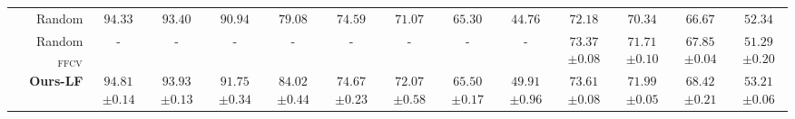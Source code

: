 \begin{table*}[tb]
{\begin{tabular}{crcccccccccccc}
    & Random & $94.33$ & $93.40$ & $90.94$ & $79.08$ & $74.59$ & $71.07$ & $65.30$ & $44.76$ & $72.18$ & $70.34$ & $66.67$ & $52.34$ \\
    &Random$_{\mathrm{FFCV}}$ & - & - & - & - & - & - & - &- & \makecell[tl]{$ 73.37$\\ \tiny{\textcolor{denim}{$\pm 0.08$}}} & \makecell[tl]{$ 71.71$\\ \tiny{\textcolor{denim}{$\pm 0.10$}}} & \makecell[tl]{$ 67.85$\\ \tiny{\textcolor{denim}{$\pm 0.04$}}} & \makecell[tl]{$51.29$\\ \tiny{\textcolor{denim}{$\pm 0.20$}}} \\
    \cmidrule(ll){2-14}
    \cmidrule(ll){2-14}
    &\textbf{Ours-LF}  
    & \makecell[tl]{$\mathbf{94.81}$\\ \tiny{\textcolor{denim}{$\pm 0.14$}}} 
    & \makecell[tl]{$\mathbf{93.93}$\\ \tiny{\textcolor{denim}{$\pm 0.13$}}} 
    & \makecell[tl]{$\mathbf{91.75}$\\ \tiny{\textcolor{denim}{$\pm 0.34$}}} 
    & \makecell[tl]{$\mathbf{84.02}$\\ \tiny{\textcolor{denim}{$\pm 0.44$}}} 
    & \makecell[tl]{$\mathbf{74.67}$\\ \tiny{\textcolor{denim}{$\pm 0.23$}}} 
    & \makecell[tl]{$\mathbf{72.07}$\\ \tiny{\textcolor{denim}{$\pm 0.58$}}} 
    & \makecell[tl]{$\mathbf{65.50}$\\ \tiny{\textcolor{denim}{$\pm 0.17$}}} 
    & \makecell[tl]{$\mathbf{49.91}$\\ \tiny{\textcolor{denim}{$\pm 0.96$}}} 
    & \makecell[tl]{$\mathbf{73.61}$\\ \tiny{\textcolor{denim}{$\pm 0.08$}}} 
    & \makecell[tl]{$\mathbf{71.99}$\\ \tiny{\textcolor{denim}{$\pm 0.05$}}} 
    & \makecell[tl]{$\mathbf{68.42}$\\ \tiny{\textcolor{denim}{$\pm 0.21$}}} 
    & \makecell[tl]{$\mathbf{53.21}$\\ \tiny{\textcolor{denim}{$\pm 0.06$}}}\\

    
    \bottomrule[1.25pt]
    \end{tabular}
    }
     \vspace{-0.2cm}
\end{table*}
